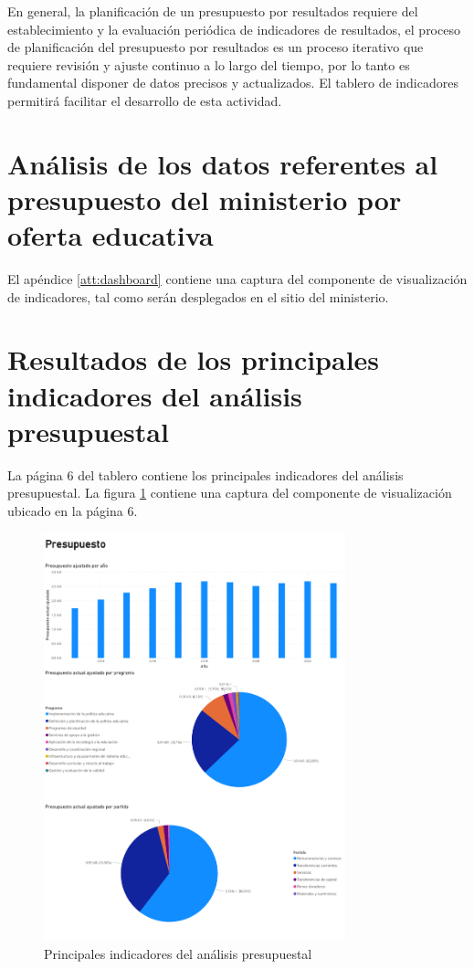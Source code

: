 \documentclass[a4paper, 9pt, conference]{article}
\begin{document}
En general, la planificaci\'on de un presupuesto por resultados requiere del establecimiento y la evaluaci\'on peri\'odica de indicadores de resultados, el proceso de planificaci\'on del presupuesto por resultados es un proceso iterativo que requiere revisi\'on y ajuste continuo a lo largo del tiempo, por lo tanto es fundamental disponer de datos precisos y actualizados. El tablero de indicadores permitir\'a facilitar el desarrollo de esta actividad.

\section{An\'alisis de los datos referentes al presupuesto del ministerio por oferta educativa} \label{sec:dashboard}

El ap\'endice \ref{att:dashboard} contiene una captura del componente de visualizaci\'on de indicadores, tal como ser\'an desplegados en el sitio del ministerio.%

\section{Resultados de los principales indicadores del an\'alisis presupuestal} \label{sec:settlement}

La p\'agina 6 del tablero contiene los principales indicadores del an\'alisis presupuestal. La figura \ref{fig:settlement} contiene una captura del componente de visualizaci\'on ubicado en la p\'agina 6.

\begin{figure}
	\centering
		\includegraphics[width=330px, keepaspectratio=false]{settlement}
			\caption{Principales indicadores del an\'alisis presupuestal}
	\label{fig:settlement}
\end{figure}
\end{document}

